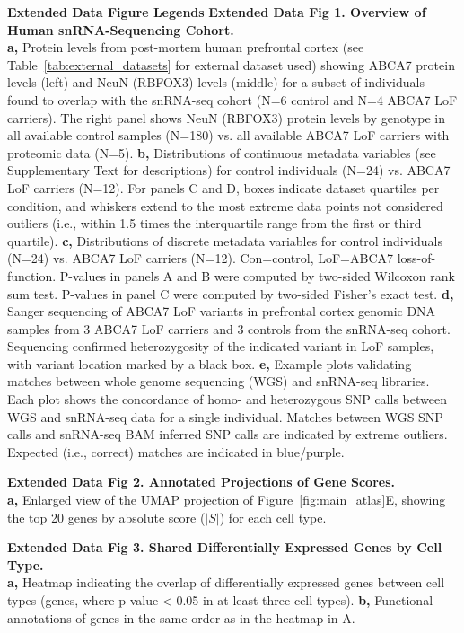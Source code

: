 \textbf{Extended Data Figure Legends}\newline\newline
\textbf{Extended Data Fig 1. Overview of Human snRNA-Sequencing Cohort.}\\
\textbf{a,} Protein levels from post-mortem human prefrontal cortex (see Table~\ref{tab:external_datasets} for external dataset used) showing ABCA7 protein levels (left) and NeuN (RBFOX3) levels (middle) for a subset of individuals found to overlap with the snRNA-seq cohort (N=6 control and N=4 ABCA7 LoF carriers). The right panel shows NeuN (RBFOX3) protein levels by genotype in all available control samples (N=180) vs. all available ABCA7 LoF carriers with proteomic data (N=5).
\textbf{b,} Distributions of continuous metadata variables (see Supplementary Text for descriptions) for control individuals (N=24) vs. ABCA7 LoF carriers (N=12). For panels C and D, boxes indicate dataset quartiles per condition, and whiskers extend to the most extreme data points not considered outliers (i.e., within 1.5 times the interquartile range from the first or third quartile). 
\textbf{c,} Distributions of discrete metadata variables for control individuals (N=24) vs. ABCA7 LoF carriers (N=12). Con=control, LoF=ABCA7 loss-of-function. P-values in panels A and B were computed by two-sided Wilcoxon rank sum test. P-values in panel C were computed by two-sided Fisher’s exact test.
\textbf{d,} Sanger sequencing of ABCA7 LoF variants in prefrontal cortex genomic DNA samples from 3 ABCA7 LoF carriers and 3 controls from the snRNA-seq cohort. Sequencing confirmed heterozygosity of the indicated variant in LoF samples, with variant location marked by a black box. 
\textbf{e,} Example plots validating matches between whole genome sequencing (WGS) and snRNA-seq libraries. Each plot shows the concordance of homo- and heterozygous SNP calls between WGS and snRNA-seq data for a single individual. Matches between WGS SNP calls and snRNA-seq BAM inferred SNP calls are indicated by extreme outliers. Expected (i.e., correct) matches are indicated in blue/purple. 

\textbf{Extended Data Fig 2. Annotated Projections of Gene Scores.}\\
\textbf{a,} Enlarged view of the UMAP projection of Figure~\ref{fig:main_atlas}E, showing the top 20 genes by absolute score ($|S|$) for each cell type. 

\textbf{Extended Data Fig 3. Shared Differentially Expressed Genes by Cell Type.}\\
\textbf{a,} Heatmap indicating the overlap of differentially expressed genes between cell types (genes, where p-value < 0.05 in at least three cell types). 
\textbf{b,} Functional annotations of genes in the same order as in the heatmap in A.

